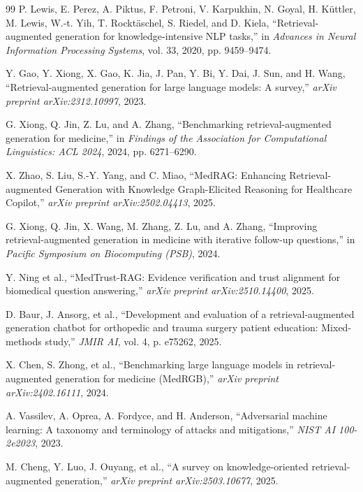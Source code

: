 \documentclass[12pt,a4paper]{article}
\begin{document}
\begin{thebibliography}{99}
P. Lewis, E. Perez, A. Piktus, F. Petroni, V. Karpukhin, N. Goyal, H. Küttler, M. Lewis, W.-t. Yih, T. Rocktäschel, S. Riedel, and D. Kiela, ``Retrieval-augmented generation for knowledge-intensive NLP tasks,'' in \textit{Advances in Neural Information Processing Systems}, vol. 33, 2020, pp. 9459--9474.

Y. Gao, Y. Xiong, X. Gao, K. Jia, J. Pan, Y. Bi, Y. Dai, J. Sun, and H. Wang, ``Retrieval-augmented generation for large language models: A survey,'' \textit{arXiv preprint arXiv:2312.10997}, 2023.

G. Xiong, Q. Jin, Z. Lu, and A. Zhang, ``Benchmarking retrieval-augmented generation for medicine,'' in \textit{Findings of the Association for Computational Linguistics: ACL 2024}, 2024, pp. 6271--6290.

X. Zhao, S. Liu, S.-Y. Yang, and C. Miao, ``MedRAG: Enhancing Retrieval-augmented Generation with Knowledge Graph-Elicited Reasoning for Healthcare Copilot,'' \textit{arXiv preprint arXiv:2502.04413}, 2025.

G. Xiong, Q. Jin, X. Wang, M. Zhang, Z. Lu, and A. Zhang, ``Improving retrieval-augmented generation in medicine with iterative follow-up questions,'' in \textit{Pacific Symposium on Biocomputing (PSB)}, 2024.

Y. Ning et al., ``MedTrust-RAG: Evidence verification and trust alignment for biomedical question answering,'' \textit{arXiv preprint arXiv:2510.14400}, 2025.

D. Baur, J. Ansorg, et al., ``Development and evaluation of a retrieval-augmented generation chatbot for orthopedic and trauma surgery patient education: Mixed-methods study,'' \textit{JMIR AI}, vol. 4, p. e75262, 2025.

X. Chen, S. Zhong, et al., ``Benchmarking large language models in retrieval-augmented generation for medicine (MedRGB),'' \textit{arXiv preprint arXiv:2402.16111}, 2024.

A. Vassilev, A. Oprea, A. Fordyce, and H. Anderson, ``Adversarial machine learning: A taxonomy and terminology of attacks and mitigations,'' \textit{NIST AI 100-2e2023}, 2023.

M. Cheng, Y. Luo, J. Ouyang, et al., ``A survey on knowledge-oriented retrieval-augmented generation,'' \textit{arXiv preprint arXiv:2503.10677}, 2025.


\end{thebibliography}
\end{document}
